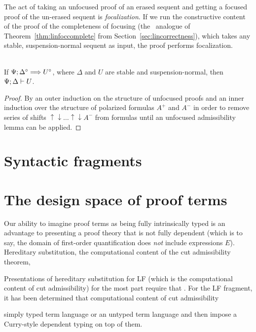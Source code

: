 The act of taking an unfocused proof of an erased sequent and getting
a focused proof of the un-erased sequent is {\it focalization}. If 
we run the constructive content of the proof of the completeness of
focusing (the \ollll~analogue of Theorem~\ref{thm:linfoccomplete} from
Section~\ref{sec:lincorrectness}), which takes any stable, 
suspension-normal sequent as input, the proof performs focalization.

\bigskip
\begin{theorem}~\\
If $\Psi; \Delta^\circ \Longrightarrow U^\circ$, where $\Delta$ and $U$ are 
stable and suspension-normal, then ${\Psi};{\Delta} \vdash {U}$. 
\end{theorem}

\begin{proof}
By an outer induction on the structure of unfocused proofs and
an inner induction over the structure of polarized formulas $A^+$ and
$A^-$ in order to remove series of shifts 
${\uparrow}{\downarrow}\ldots{\uparrow}{\downarrow}A^-$ from formulas until
an unfocused admissibility lemma can be applied.
\end{proof}

\section{Syntactic fragments}

\section{The design space of proof terms}

Our ability to imagine proof terms as being fully intrinsically typed
is an advantage to presenting a proof theory that is not fully
dependent (which is to say, the domain of first-order quantification
does {\it not} include expressions $E$). Hereditary substitution, 
the computational content of the cut admissibility theorem, 

Presentations of hereditary
substitution for LF (which is the computational content of cut
admissibility) for the most part require that . For the LF
fragment, it has been determined that computational content of cut
admissibility

 simply typed term language
\cite{watkins02concurrent,harper07mechanizing} or an untyped term
language \cite{reed07properties,martens11mechanizing} and then impose
a Curry-style dependent typing on top of them.

